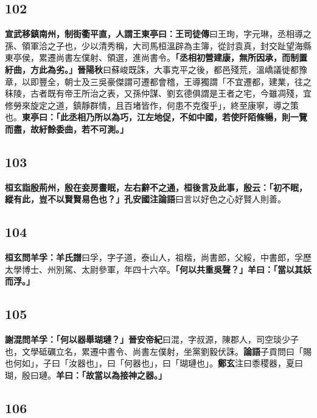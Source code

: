 \subsection*{102}

\textbf{宣武移鎮南州，制街衢平直，人謂王東亭曰：}{\footnotesize \textbf{王司徒傳}曰王珣，字元琳，丞相導之孫、領軍洽之子也，少以清秀稱，大司馬桓溫辟為主簿，從討袁真，封交趾望海縣東亭侯，累遷尚書左僕射、領選，進尚書令。}\textbf{「丞相初營建康，無所因承，而制置紆曲，方此為劣。」}{\footnotesize \textbf{晉陽秋}曰蘇峻既誅，大事克平之後，都邑殘荒，溫嶠議徙都豫章，以即豐全，朝士及三吳豪傑謂可遷都會稽，王導獨謂「不宜遷都，建業，往之秣陵，古者既有帝王所治之表，又孫仲謀、劉玄德俱謂是王者之宅，今雖凋殘，宜修勞來旋定之道，鎮靜群情，且百堵皆作，何患不克復乎」，終至康寧，導之策也。}\textbf{東亭曰：「此丞相乃所以為巧，江左地促，不如中國，若使阡陌條暢，則一覽而盡，故紆餘委曲，若不可測。」}

\subsection*{103}

\textbf{桓玄詣殷荊州，殷在妾房晝眠，左右辭不之通，桓後言及此事，殷云：「初不眠，縱有此，豈不以賢賢易色也？」}{\footnotesize \textbf{孔安國注論語}曰言以好色之心好賢人則善。}

\subsection*{104}

\textbf{桓玄問羊孚：}{\footnotesize \textbf{羊氏譜}曰孚，字子道，泰山人，祖楷，尚書郎，父綏，中書郎，孚歷太學博士、州別駕、太尉參軍，年四十六卒。}\textbf{「何以共重吳聲？」羊曰：「當以其妖而浮。」}

\subsection*{105}

\textbf{謝混問羊孚：「何以器舉瑚璉？」}{\footnotesize \textbf{晉安帝紀}曰混，字叔源，陳郡人，司空琰少子也，文學砥礪立名，累遷中書令、尚書左僕射，坐黨劉毅伏誅。\textbf{論語}子貢問曰「賜也何如」，子曰「汝器也」，曰「何器也」，曰「瑚璉也」。\textbf{鄭玄}注曰黍稷器，夏曰瑚，殷曰璉。}\textbf{羊曰：「故當以為接神之器。」}

\subsection*{106}

